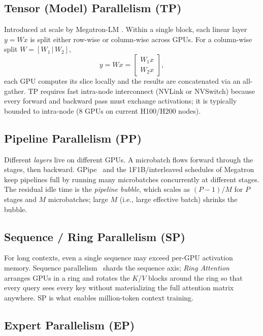 \subsection{Tensor (Model) Parallelism (TP)}

Introduced at scale by Megatron-LM
\citep{shoeybi2019megatron,narayanan2021efficient}. Within a single
block, each linear layer $y = W x$ is split either row-wise or
column-wise across GPUs. For a column-wise split
$W = [W_1 \,|\, W_2]$,
\begin{equation}
y = W x = \begin{bmatrix} W_1 x \\ W_2 x \end{bmatrix},
\end{equation}
each GPU computes its slice locally and the results are concatenated
via an all-gather. TP requires fast intra-node interconnect (NVLink
or NVSwitch) because every forward and backward pass must exchange
activations; it is typically bounded to intra-node (8 GPUs on
current H100/H200 nodes).

\subsection{Pipeline Parallelism (PP)}

Different \emph{layers} live on different GPUs. A microbatch flows
forward through the stages, then backward.
GPipe~\citep{huang2019gpipe} and the 1F1B/interleaved schedules of
Megatron keep pipelines full by running many microbatches
concurrently at different stages. The residual idle time is the
\emph{pipeline bubble}, which scales as $(P - 1) / M$ for $P$ stages
and $M$ microbatches; large $M$ (i.e., large effective batch) shrinks
the bubble.

\subsection{Sequence / Ring Parallelism (SP)}

For long contexts, even a single sequence may exceed per-GPU
activation memory. Sequence
parallelism~\citep{li2023sequence,korthikanti2023reducing} shards
the sequence axis; \emph{Ring Attention}~\citep{liu2023ringattention}
arranges GPUs in a ring and rotates the $K$/$V$ blocks around the
ring so that every query sees every key without materializing the
full attention matrix anywhere. SP is what enables million-token
context training.

\subsection{Expert Parallelism (EP)}

